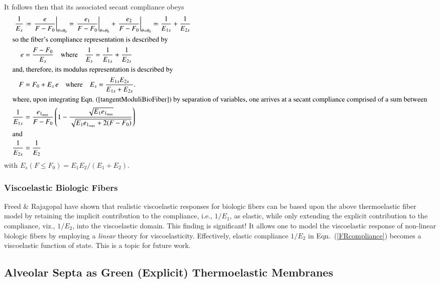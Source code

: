 It follows then that its associated secant compliance obeys
\begin{subequations}
    \label{secantFiberModulus}
    \begin{align}
    \frac{1}{E_s} & \defeq 
    \left. \frac{e}{F-F_0} \right|_{\theta = \theta_0} = 
    \left. \frac{e_1}{F-F_0} \right|_{\theta = \theta_0} + 
    \left. \frac{e_2}{F-F_0} \right|_{\theta = \theta_0} \eqdef 
    \frac{1}{E_{1s}} + \frac{1}{E_{2s}} \\
    \intertext{so the fiber's compliance representation is described by}
    e & = \frac{F - F_0}{E_s} 
    \quad \text{where} \quad
    \frac{1}{E_s} = \frac{1}{E_{1s}} + \frac{1}{E_{2s}} \\
    \intertext{and, therefore, its modulus representation is described by}
    F & = F_0 + E_s \, e
    \quad \text{where} \quad
    E_s = \frac{E_{1s} E_{2s}}{E_{1s} + E_{2s}} . \\
    \intertext{where, upon integrating Eqn.~(\ref{tangentModuliBioFiber}) by separation of variables, one arrives at a secant compliance comprised of a sum between}
    \frac{1}{E_{1s}} & = \frac{e_{1_{\max}}}{F-F_0} \left( 1 - 
    \frac{\sqrt{E_1 e_{1_{\max}}}}
    {\sqrt{E_1 e_{1_{\max}} + 2(F-F_0)}} \right)  \\
    \intertext{and}
    \frac{1}{E_{2s}} & = \frac{1}{E_2}
    \end{align}
\end{subequations}
with $E_s(F \! \leq \! F_0) = E_1 E_2 / (E_1 + E_2)$. 

\subsubsection{Viscoelastic Biologic Fibers}

Freed \& Rajagopal \cite{FreedRajagopal16a} have shown that realistic visco\-elastic responses for biologic fibers can be based upon the above thermo\-elastic fiber model by retaining the implicit contribution to the compliance, i.e., $1/E_1$, as elastic, while only extending the explicit contribution to the compliance, viz., $1/E_2$, into the visco\-elastic domain.  This finding is significant!  It allows one to model the visco\-elastic response of non-linear biologic fibers by employing a \textit{linear\/} theory for visco\-elasticity.  Effectively, elastic compliance $1/E_2$ in Eqn.~(\ref{FRcompliance}) becomes a visco\-elastic function of state.  This is a topic for future work.

\subsection{Alveolar Septa as Green (Explicit) Thermoelastic Membranes}

